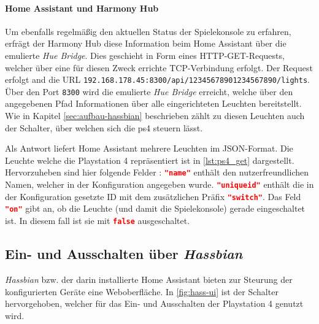 






\paragraph{Home Assistant und Harmony Hub}
Um ebenfalls regelmäßig den aktuellen Status der Spielekonsole zu erfahren,
erfrägt der Harmony Hub diese Information beim Home Assistant über die emulierte \textit{Hue Bridge}.
Dies geschieht in Form eines HTTP-GET-Requests,
welcher über eine für diesen Zweck errichte TCP-Verbindung erfolgt.
Der Request erfolgt and die URL \nolinkurl{192.168.178.45:8300/api/12345678901234567890/lights}.
Über den Port \texttt{8300} wird die emulierte \textit{Hue Bridge} erreicht,
welche über den angegebenen Pfad Informationen über alle eingerichteten Leuchten bereitstellt.
Wie in Kapitel \ref{sec:aufbau-hassbian} \textit{} beschrieben zählt zu diesen Leuchten
auch der Schalter, über welchen sich die \ac{ps4} steuern lässt.

Als Antwort liefert Home Assistant mehrere Leuchten im JSON-Format.
Die Leuchte welche die Playstation 4 repräsentiert ist in \autoref{lst:ps4_get} dargestellt.
Hervorzuheben sind hier folgende Felder :
\lstinline[language=json]{"name"} enthält den nutzerfreundlichen Namen,
welcher in der Konfiguration angegeben wurde.
\lstinline[language=json]{"uniqueid"} enthält die
in der Konfiguration gesetzte ID mit dem zusätzlichen Präfix \lstinline[language=json]{"switch"}.
Das Feld \lstinline[language=json]{"on"} gibt an, ob die Leuchte (und damit die Spielekonsole) gerade eingeschaltet ist.
In diesem fall ist sie mit \lstinline[language=json]{false} ausgeschaltet.




\subsection{Ein- und Ausschalten über \textit{Hassbian}}\label{sec:durchfuehrung-hassbian}
\textit{Hassbian} bzw. der darin installierte Home Assistant bieten zur Steurung der konfigurierten Geräte eine Weboberfläche.
In \autoref{fig:hass-ui} ist der Schalter hervorgehoben, welcher für das Ein- und Ausschalten der Playstation 4 genutzt wird.

